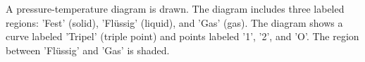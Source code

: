 A pressure-temperature diagram is drawn. The diagram includes three labeled regions: 'Fest' (solid), 'Flüssig' (liquid), and 'Gas' (gas). The diagram shows a curve labeled 'Tripel' (triple point) and points labeled '1', '2', and 'O'. The region between 'Flüssig' and 'Gas' is shaded.